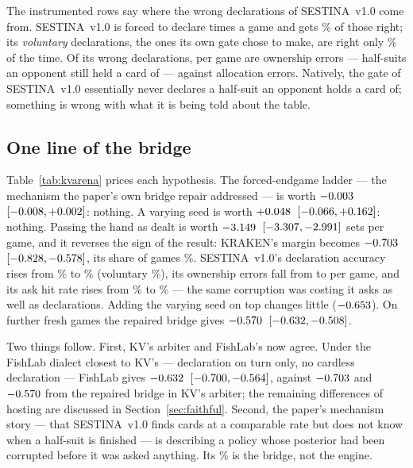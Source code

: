 \documentclass[11pt]{article}
\newcommand{\sestina}{\mbox{SESTINA v1.0}}
\newcommand{\pct}{\%}
\begin{document}
The instrumented rows say where the wrong declarations of \sestina{} come from. \sestina{} is forced to
declare \kcVRevTwoForcedPerGame{} times a game and gets \kcVRevTwoForcedS\pct{} of those right; its
\emph{voluntary} declarations, the ones its own gate chose to make, are right only
\kcVRevTwoVolS\pct{} of the time. Of its wrong declarations, \kcVRevTwoOwnErr{} per game are
ownership errors --- half-suits an opponent still held a card of --- against \kcVRevTwoAllocErr{}
allocation errors. Natively, the gate of \sestina{} essentially never declares a half-suit an opponent
holds a card of; something is wrong with what it is being told about the table.

\subsection{One line of the bridge}
\label{sec:variants}

\begin{table}[!ht]
\caption{Bridge variants inside KV's arbiter. All rows but the last are the same \kcVRevTwoGames{}
games (1,000 deals $\times$ 2 parities, same deal and agent seeds), so the paired column is a per-game
difference on identical deals. ``K'' is KRAKEN, ``S'' is \sestina{}.}
\label{tab:kvarena}
\small

\end{table}

Table~\ref{tab:kvarena} prices each hypothesis. The forced-endgame ladder --- the mechanism the
paper's own bridge repair addressed --- is worth $-0.003$~$[-0.008,
+0.002]$: nothing. A varying seed is worth $+0.048$~$[-0.066,
+0.162]$: nothing. Passing the hand as dealt is worth $-3.149$~$[-3.307, -2.991]$ sets per game, and it reverses the sign of the result:
KRAKEN's margin becomes $-0.703$~$[-0.828, -0.578]$, its share of games
\kcVDealtWin\pct{}. \sestina{}'s declaration accuracy rises from \kcVRevTwoDeclS\pct{} to
\kcVDealtDeclS\pct{} (voluntary \kcVDealtVolS\pct{}), its ownership errors fall from
\kcVRevTwoOwnErr{} to \kcVDealtOwnErr{} per game, and its ask hit rate rises from
\kcVRevTwoAskS\pct{} to \kcVDealtAskS\pct{} --- the same corruption was costing it asks as well as
declarations. Adding the varying seed on top changes little ($-0.653$). On
\kcVDealtBigGames{} further fresh games the repaired bridge gives $-0.570$~$[-0.632, -0.508]$.

Two things follow. First, KV's arbiter and FishLab's now agree. Under the FishLab dialect closest to
KV's --- declaration on turn only, no cardless declaration --- FishLab gives $-0.632$~$[-0.700, -0.564]$, against $-0.703$ and $-0.570$
from the repaired bridge in KV's arbiter; the remaining differences of hosting are discussed in
Section~\ref{sec:faithful}. Second, the
paper's mechanism story --- that \sestina{} finds cards at a comparable rate but does not know when a
half-suit is finished --- is describing a policy whose posterior had been corrupted before it was asked
anything. Its \kcMegaDeclS\pct{} is the bridge, not the engine.
\end{document}
